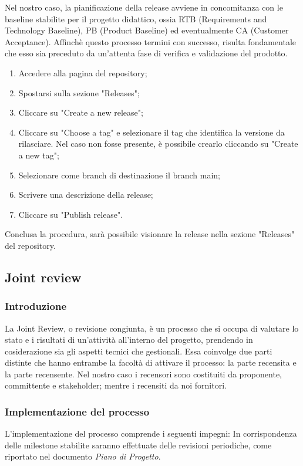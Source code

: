 Nel nostro caso, la pianificazione della release avviene in concomitanza con le baseline stabilite per il progetto didattico, ossia
RTB (Requirements and Technology Baseline),
PB (Product Baseline) ed eventualmente CA (Customer Acceptance).
Affinchè questo processo termini con successo, risulta fondamentale che esso sia preceduto da un'attenta fase di verifica e validazione del prodotto.

\begin{enumerate}
	\item Accedere alla pagina del repository;
	\item Spostarsi sulla sezione "Releases";
	\item Cliccare su "Create a new release";
	\item Cliccare su "Choose a tag" e selezionare il tag che identifica la versione da rilasciare. Nel caso non fosse presente, è possibile
	      crearlo cliccando su "Create a new tag";
	\item Selezionare come branch di destinazione il branch main;
	\item Scrivere una descrizione della release;
	\item Cliccare su "Publish release".
\end{enumerate}
Conclusa la procedura, sarà possibile visionare la release nella sezione "Releases" del repository.

\subsection{Joint review}
\subsubsection{Introduzione}
La Joint Review, o revisione congiunta, è un processo che si occupa di valutare lo stato e i risultati di un'attività
all'interno del progetto, prendendo in cosiderazione sia gli aspetti tecnici che gestionali. Essa coinvolge due parti distinte che hanno entrambe
la facoltà di attivare il processo: la parte recensita e la parte recensente. Nel nostro caso i recensori sono costituiti da
proponente, committente e stakeholder;
mentre i recensiti da noi fornitori.

\subsubsection{Implementazione del processo}
L'implementazione del processo comprende i seguenti impegni:
In corrispondenza delle milestone stabilite saranno effettuate delle revisioni periodiche, come riportato nel
documento \textit{Piano di Progetto}.


